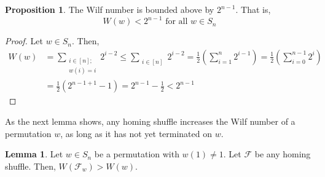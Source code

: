 \documentclass[final,nomarks]{dmtcs-episciences}
\theoremstyle{definition}
\newtheorem{lem}[thm]{Lemma}
\newtheorem{prop}[thm]{Proposition}
\theoremstyle{definition}
\theoremstyle{remark}
\newcommand{\f}{\mathcal{F}} %
\newcommand{\tup}[1]{\left( #1 \right)}
\begin{document}
\begin{prop}
    \label{wBound}
The Wilf number is bounded above by $ 2^{n-1} $. That is,
    \[
    W\tup{ w } < 2^{n-1} \text{ for all } w \in S_{n}
    \]
\end{prop}
\begin{proof}
Let $w \in S_n$. Then,
   \begin{align*}
       W\tup{ w } &= \sum_{\substack{i \in [n];\\ w\tup{ i }=i}} 2^{i-2} \le \sum_{\substack{i \in [n]}} 2^{i-2}  = \frac{1}{2}\tup{ \sum_{i=1}^{n}2^{i-1} } = \frac{1}{2}\tup{ \sum_{i=0}^{n-1}2^{i} }\\
       &= \frac{1}{2}\tup{ 2^{n-1+1}-1 } = 2^{n-1}-\frac{1}{2} < 2^{n-1}
   \end{align*} 
\end{proof}

As the next lemma shows, any homing shuffle increases the Wilf number of a permutation $w$, as long as it has not yet terminated on $w$.
\begin{lem}
\label{lemwilf}
    Let $w \in S_n$ be a permutation with $w\tup{1} \neq 1$.
    Let $\f$ be any homing shuffle.
    Then, $W\tup{\f_w} > W\tup{w}$.
\end{lem}
\end{document}
